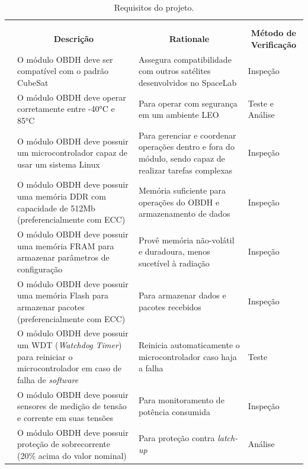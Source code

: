 \begin{longtable}{@{}>{\centering}p{1.5cm}p{4cm}p{4cm}p{4.7cm}@{}}
    \centering
	\ABNTEXfontereduzida
	\label{tab:Tab_Req}\tabularnewline
	\caption{Requisitos do projeto.}\tabularnewline
	\hline
	\multicolumn{1}{c}{\textbf{Índice}} & \multicolumn{1}{c}{\textbf{Descrição}} & \multicolumn{1}{c}{\textbf{Rationale}} & \multicolumn{1}{c}{\textbf{Método de Verificação}} \tabularnewline
        \hline
        1 & O módulo OBDH deve ser compatível com o padrão CubeSat & Assegura compatibilidade com outros satélites desenvolvidos no SpaceLab & Inspeção \tabularnewline
        
       \hline
        2 & O módulo OBDH deve operar corretamente entre -40°C e 85°C & Para operar com segurança em um ambiente LEO & Teste e Análise \tabularnewline

       \hline
       3 & O módulo OBDH deve possuir um microcontrolador capaz de usar um sistema Linux & Para gerenciar e coordenar operações dentro e fora do módulo, sendo capaz de realizar tarefas complexas  & Inspeção \tabularnewline

       \hline
        4 & O módulo OBDH deve possuir uma memória DDR com capacidade de 512Mb (preferencialmente com ECC)  & Memória suficiente para operações do OBDH e armazenamento de dados  & Inspeção\tabularnewline

        \hline
       5 & O módulo OBDH deve possuir uma memória FRAM para armazenar parâmetros de configuração & Provê memória não-volátil e duradoura, menos sucetível à radiação & Inspeção \tabularnewline 

        \hline
        6 & O módulo OBDH deve possuir uma memória Flash para armazenar pacotes (preferencialmente com ECC) & Para armazenar dados e pacotes recebidos & Inspeção \tabularnewline 

        \hline
       7 & O módulo OBDH deve possuir um WDT (\textit{Watchdog Timer}) para reiniciar o microcontrolador em caso de falha de \textit{software} & Reinicia automaticamente o microcontrolador caso haja a falha  & Teste \tabularnewline

        \hline
       8 & O módulo OBDH deve possuir sensores de medição de tensão e corrente em suas tensões & Para monitoramento de potência consumida & Inspeção \tabularnewline

        \hline
      9 &  O módulo OBDH deve possuir proteção de sobrecorrente (20\% acima do valor nominal) & Para proteção contra \textit{latch-up}  & Análise \tabularnewline


\end{longtable}

